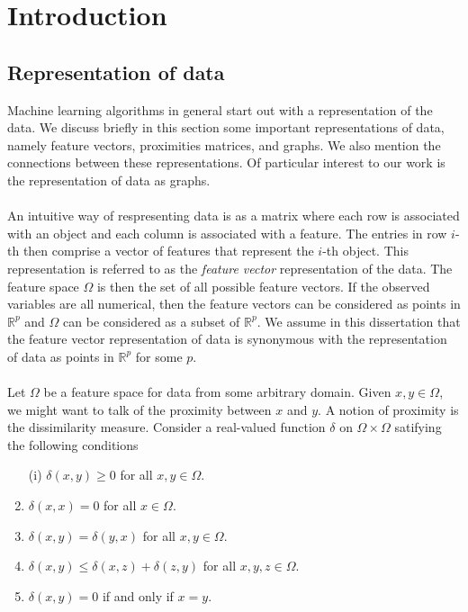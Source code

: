 \chapter{Introduction}
\label{cha:introduction}

\section{Representation of data}
\label{sec:representation-data}
Machine learning algorithms in general start out with a representation
of the data. We discuss briefly in this section some important
representations of data, namely feature vectors, proximities matrices,
and graphs. We also mention the connections between these
representations. Of particular interest to our work is the
representation of data as graphs. \\ \\
%
%
\noindent An intuitive way of respresenting data is as a matrix where
each row is associated with an object and each column is associated
with a feature. The entries in row $i$-th then comprise a vector of
features that represent the $i$-th object. This representation is
referred to as the \emph{feature vector} representation of the
data. The feature space $\Omega$ is then the set of all possible
feature vectors. If the observed variables are all numerical, then the
feature vectors can be considered as points in $\mathbb{R}^{p}$ and
$\Omega$ can be considered as a subset of $\mathbb{R}^{p}$. We assume
in this dissertation that the feature vector representation of data is
synonymous with the representation of data as points in
$\mathbb{R}^{p}$ for some $p$. \\ \\
%
%
\noindent 
Let $\Omega$ be a feature space for data from some arbitrary
domain. Given $x, y \in \Omega$, we might want to talk of the
proximity between $x$ and $y$. A notion of proximity is the
dissimilarity measure. Consider a real-valued function $\delta$ on $\Omega
\times \Omega$ satifying the following conditions
\begin{enumerate}
\item[(i)] $\delta(x,y) \geq 0$ for all $x, y \in \Omega$.
\item $\delta(x,x) = 0$ for all $x \in \Omega$.
\item $\delta(x,y) = \delta(y,x)$ for all $x, y \in \Omega$.
\item $\delta(x,y) \leq \delta(x,z) + \delta(z,y)$ for all $x,y,z \in \Omega$.
\item $\delta(x,y) = 0$ if and only if $x = y$. 
\end{enumerate}
